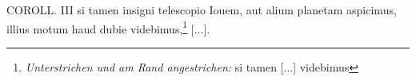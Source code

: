 \pend \vspace{3.0ex}\pstart \centering [p.~21] COROLL. III \pend \vspace{1.0ex} \pstart [...] si tamen insigni telescopio\protect{} Iouem\protect{}, aut alium planetam\protect{} aspicimus, illius motum haud dubie videbimus,\footnote{\textit{Unterstrichen und am Rand angestrichen:} si tamen [...] videbimus } [...].